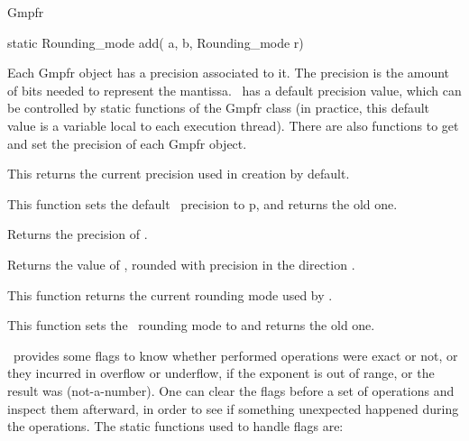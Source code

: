 \begin{ccRefClass} {Gmpfr}
\ccOperations

\ccSetThreeColumns
        {static Rounding\_mode}
        {add( a, b, Rounding\_mode r)}
        {}


Each Gmpfr object has a precision associated to it. The precision is the
amount of bits needed to represent the mantissa. \mpfr\ has a default
precision value, which can be controlled by static functions of the Gmpfr
class (in practice, this default value is a variable local to each
execution thread). There are also functions to get and set the precision of
each Gmpfr object.

        {This returns the current precision used in 
        creation by default.}

        {This function sets the default \mpfr\ precision to p, and returns
        the old one.}

        {Returns the precision of \ccVar.}

        {Returns the value of \ccVar, rounded with precision 
        in the direction .}


        {This function returns the current rounding mode used by \mpfr.}

        {This function sets the \mpfr\ rounding mode to  and returns
        the old one.}



\mpfr\ provides some flags to know whether performed operations were exact
or not, or they incurred in overflow or underflow, if the exponent is
out of range, or the result was  (not-a-number). One can clear the
flags before a set of operations and inspect them afterward, in order to
see if something unexpected happened during the operations. The static
functions used to handle flags are:


\end{ccRefClass}
